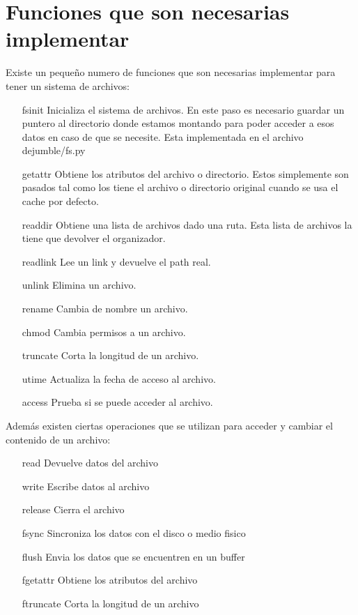 \section{Funciones que son necesarias implementar}
\label{funciones}

Existe un pequeño numero de funciones que son necesarias implementar para tener un sistema de archivos:

\begin{itemize}
\item[fsinit] Inicializa el sistema de archivos. En este paso es necesario guardar un puntero al directorio donde estamos montando para poder acceder a esos datos en caso de que se necesite. Esta implementada en el archivo dejumble/fs.py
\item[getattr] Obtiene los atributos del archivo o directorio. Estos simplemente son pasados tal como los tiene el archivo o directorio original cuando se usa el cache por defecto.
\item[readdir] Obtiene una lista de archivos dado una ruta. Esta lista de archivos la tiene que devolver el organizador.
\item[readlink] Lee un link	y devuelve el path real.\item[unlink] Elimina un archivo.
\item[rename] Cambia de nombre un archivo.
\item[chmod] Cambia permisos a un archivo.
\item[truncate] Corta la longitud de un archivo.
\item[utime] Actualiza la fecha de acceso al archivo.
\item[access] Prueba si se puede acceder al archivo.
\end{itemize}

Además existen ciertas operaciones que se utilizan para acceder y cambiar el contenido de un archivo:

\begin{itemize}
\item[read] Devuelve datos del archivo
\item[write] Escribe datos al archivo
\item[release] Cierra el archivo
\item[fsync] Sincroniza los datos con el disco o medio fisico
\item[flush] Envia los datos que se encuentren en un buffer
\item[fgetattr] Obtiene los atributos del archivo
\item[ftruncate] Corta la longitud de un archivo
\end{itemize}


